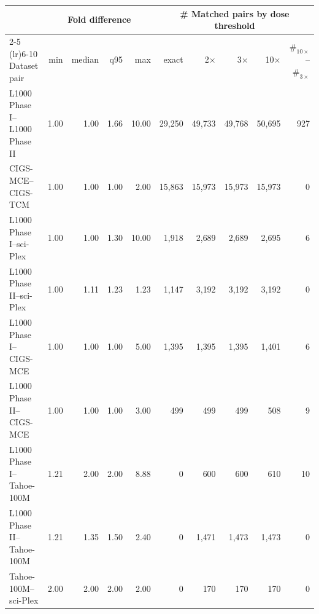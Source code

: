 \begin{table}[t]
\label{tab:dose_mismatch}
\centering
\footnotesize
\setlength{\tabcolsep}{3pt}
\begin{tabular}{lrrrrrrrrr}
\toprule
& \multicolumn{4}{c}{Fold difference} &
\multicolumn{5}{c}{\# Matched pairs by dose threshold} \\
\cmidrule(lr){2-5} \cmidrule(lr){6-10}
Dataset pair & min & median & q95 & max &
exact & 2$\times$ & 3$\times$ & 10$\times$ & $\#_{10\times}$--$\#_{3\times}$ \\
\midrule
L1000 Phase I--L1000 Phase II &
1.00 & 1.00 & 1.66 & 10.00 &
29{,}250 & 49{,}733 & 49{,}768 & 50{,}695 & 927 \\
CIGS-MCE--CIGS-TCM &
1.00 & 1.00 & 1.00 & 2.00 &
15{,}863 & 15{,}973 & 15{,}973 & 15{,}973 & 0 \\
L1000 Phase I--sci-Plex &
1.00 & 1.00 & 1.30 & 10.00 &
1{,}918 & 2{,}689 & 2{,}689 & 2{,}695 & 6 \\
L1000 Phase II--sci-Plex &
1.00 & 1.11 & 1.23 & 1.23 &
1{,}147 & 3{,}192 & 3{,}192 & 3{,}192 & 0 \\
L1000 Phase I--CIGS-MCE &
1.00 & 1.00 & 1.00 & 5.00 &
1{,}395 & 1{,}395 & 1{,}395 & 1{,}401 & 6 \\
L1000 Phase II--CIGS-MCE &
1.00 & 1.00 & 1.00 & 3.00 &
499 & 499 & 499 & 508 & 9 \\
L1000 Phase I--Tahoe-100M &
1.21 & 2.00 & 2.00 & 8.88 &
0 & 600 & 600 & 610 & 10 \\
L1000 Phase II--Tahoe-100M &
1.21 & 1.35 & 1.50 & 2.40 &
0 & 1{,}471 & 1{,}473 & 1{,}473 & 0 \\
Tahoe-100M--sci-Plex &
2.00 & 2.00 & 2.00 & 2.00 &
0 & 170 & 170 & 170 & 0 \\
\bottomrule
\end{tabular}
\end{table}
